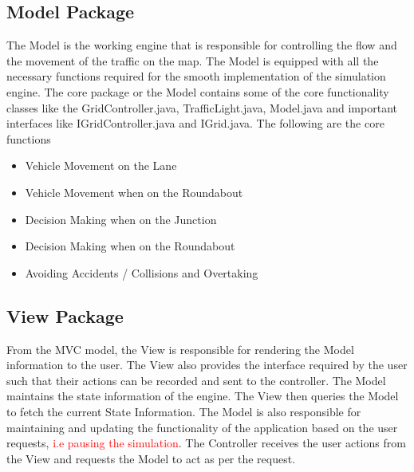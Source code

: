 \documentclass{article}
\begin{document}
\subsection{Model Package}	
The Model is the working engine that is responsible for controlling the flow and the movement of the traffic on the map. The Model is equipped with all the necessary functions required for the smooth implementation of the simulation engine. The core package or the Model contains some of the core functionality classes like the GridController.java, TrafficLight.java, Model.java and important interfaces like IGridController.java and IGrid.java.
The following are the core functions

\begin{itemize}
\item Vehicle Movement on the Lane
\item Vehicle Movement when on the Roundabout
\item Decision Making when on the Junction
\item Decision Making when on the Roundabout
\item Avoiding Accidents / Collisions and Overtaking
\end{itemize}

\subsection{View Package}

From the MVC model, the View is responsible for rendering the Model information to the user. The View also provides the interface required by the user such that their actions can be recorded and sent to the controller. The Model maintains the state information of the engine. The View then queries the Model to fetch the current State Information. The Model is also responsible for maintaining and updating the functionality of the application based on the user requests, \textcolor{red}{i.e pausing the simulation}. The Controller receives the user actions from the View and requests the Model to act as per the request.
\end{document}
